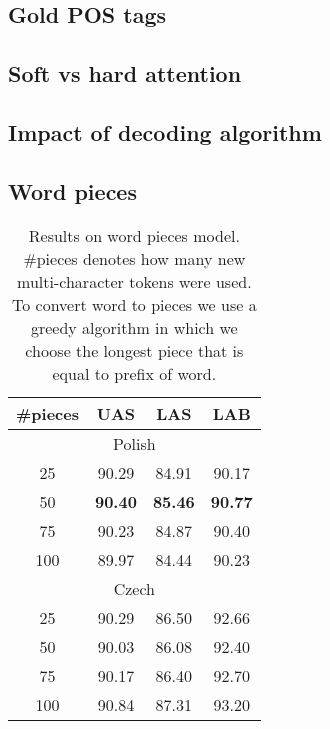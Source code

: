 \subsection{Gold POS tags}


\subsection{Soft vs hard attention}


\subsection{Impact of decoding algorithm}


\subsection{Word pieces}
\begin{table}[!htbp]
    \centering
    \begin{tabular}{c c c c}
        \#pieces & UAS & LAS & LAB \\ \hline
        \multicolumn{4}{c}{Polish}\\
        25 & 90.29 &  84.91 &  90.17 \\
        50 & \textbf{90.40} &  \textbf{85.46} &  \textbf{90.77} \\
        75 &  90.23 & 84.87 &  90.40 \\
        100 & 89.97 & 84.44 & 90.23 \\\hline
        \multicolumn{4}{c}{Czech}\\
        25 & 90.29 & 86.50 & 92.66\\
        50 & 90.03 & 86.08 & 92.40\\
        75 & 90.17 & 86.40 & 92.70\\
        100 &90.84 & 87.31 & 93.20
    \end{tabular}
    \caption{Results on word pieces model. \#pieces denotes how many new
    multi-character tokens were used. To convert word to pieces we
    use a greedy algorithm in which we choose the longest piece that is equal
    to prefix of word.}
    \label{tab:word_pieces}
\end{table}


